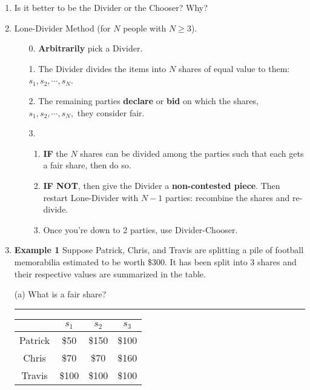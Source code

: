 \documentclass[12pt]{article}
\renewcommand{\emph}[1]{\textsf{\textbf{#1}}}
\begin{document}
\begin{enumerate}
\begin{enumerate}
	\end{enumerate}
\vfill
\item Is it better to be the Divider or the Chooser? Why?
\vspace{0.5in}
\newpage
\item Lone-Divider Method (for $N$ people with $N \geq 3$).
	\begin{enumerate}
	\item[0.] \emph{Arbitrarily} pick a Divider.
	\item[1.] The Divider divides the items into $N$ shares of equal value to them: $s_1,s_2, \cdots, s_N$.
	\item[2.] The remaining parties \textbf{declare} or \textbf{bid} on which the shares, $s_1,s_2, \cdots, s_N,$ they consider fair. 
	\item[3.] 
		\begin{enumerate}
		\item \textbf{IF} the $N$ shares can be divided among the parties such that each gets a fair share, then do so. 
		\item \textbf{IF NOT}, then give the Divider a \textbf{non-contested piece}. Then restart Lone-Divider with $N-1$ parties: recombine the shares and re-divide.
		\item Once you're down to 2 parties, use Divider-Chooser.
		\end{enumerate}
	\end{enumerate}
\item \textbf{Example 1} Suppose Patrick, Chris, and Travis are splitting a pile of football memorabilia estimated to be worth \$300. It has been split into 3 shares and their respective values are summarized in the table.

(a) What is a fair share? \rule{2cm}{.5pt}
\begin{multicols}{2}
\begin{tabular}{c||c|c|c}
&$s_1$&$s_2$&$s_3$\\
\hline \hline
Patrick&\$50&\$150&\$100\\
Chris&\$70&\$70&\$160\\
Travis&\$100&\$100&\$100\\
\end{tabular} 


\end{multicols}
\end{enumerate}
\end{document}
